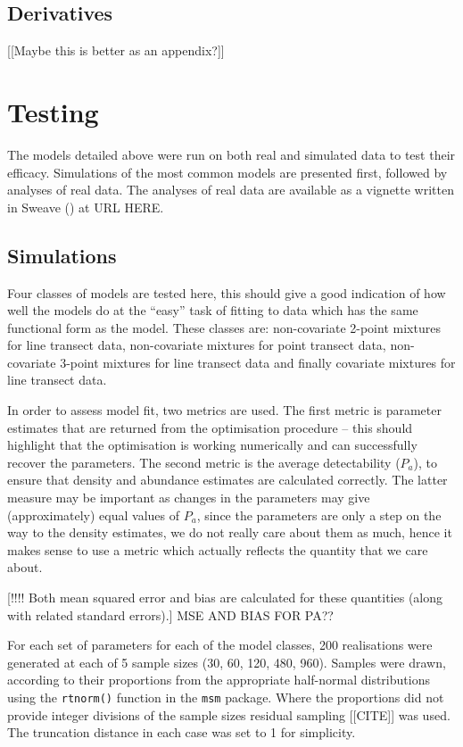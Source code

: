 \subsection{Derivatives}
[[Maybe this is better as an appendix?]]


\section{Testing}

The models detailed above were run on both real and simulated data to test their efficacy. Simulations of the most common models are presented first, followed by analyses of real data. The analyses of real data are available as a vignette written in Sweave (\cite{sweave}) at URL HERE.

\subsection{Simulations}

Four classes of models are tested here, this should give a good indication of how well the models do at the ``easy'' task of fitting to data which has the same functional form as the model. These classes are: non-covariate 2-point mixtures for line transect data, non-covariate mixtures for point transect data, non-covariate 3-point mixtures for line transect data and finally covariate mixtures for line transect data.

In order to assess model fit, two metrics are used. The first metric is parameter estimates that are returned from the optimisation procedure -- this should highlight that the optimisation is working numerically and can successfully recover the parameters. The second metric is the average detectability ($P_a$), to ensure that density and abundance estimates are calculated correctly. The latter measure may be important as changes in the parameters may give (approximately) equal values of $P_a$, since the parameters are only a step on the way to the density estimates, we do not really care about them as much, hence it makes sense to use a metric which actually reflects the quantity that we care about. 


[!!!! Both mean squared error and bias are calculated for these quantities (along with related standard errors).] MSE AND BIAS FOR PA??

For each set of parameters for each of the model classes, 200 realisations were generated at each of 5 sample sizes (30, 60, 120, 480, 960). Samples were drawn, according to their proportions from the appropriate half-normal distributions using the \texttt{rtnorm()} function in the \texttt{msm} package. Where the proportions did not provide integer divisions of the sample sizes residual sampling [[CITE]] was used. The truncation distance in each case was set to 1 for simplicity.


